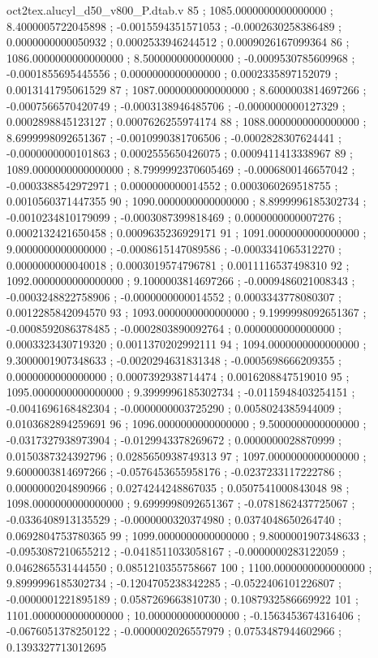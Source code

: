 \begin{filecontents}[overwrite]{oct2tex.alucyl_d50_v800_P.dtab.v}
85 ; 1085.0000000000000000 ; 8.4000005722045898 ; -0.0015594351571053 ; -0.0002630258386489 ; 0.0000000000050932 ; 0.0002533946244512 ; 0.0009026167099364
86 ; 1086.0000000000000000 ; 8.5000000000000000 ; -0.0009530785609968 ; -0.0001855695445556 ; 0.0000000000000000 ; 0.0002335897152079 ; 0.0013141795061529
87 ; 1087.0000000000000000 ; 8.6000003814697266 ; -0.0007566570420749 ; -0.0003138946485706 ; -0.0000000000127329 ; 0.0002898845123127 ; 0.0007626255974174
88 ; 1088.0000000000000000 ; 8.6999998092651367 ; -0.0010990381706506 ; -0.0002828307624441 ; -0.0000000000101863 ; 0.0002555650426075 ; 0.0009411413338967
89 ; 1089.0000000000000000 ; 8.7999992370605469 ; -0.0006800146657042 ; -0.0003388542972971 ; 0.0000000000014552 ; 0.0003060269518755 ; 0.0010560371447355
90 ; 1090.0000000000000000 ; 8.8999996185302734 ; -0.0010234810179099 ; -0.0003087399818469 ; 0.0000000000007276 ; 0.0002132421650458 ; 0.0009635236929171
91 ; 1091.0000000000000000 ; 9.0000000000000000 ; -0.0008615147089586 ; -0.0003341065312270 ; 0.0000000000040018 ; 0.0003019574796781 ; 0.0011116537498310
92 ; 1092.0000000000000000 ; 9.1000003814697266 ; -0.0009486021008343 ; -0.0003248822758906 ; -0.0000000000014552 ; 0.0003343778080307 ; 0.0012285842094570
93 ; 1093.0000000000000000 ; 9.1999998092651367 ; -0.0008592086378485 ; -0.0002803890092764 ; 0.0000000000000000 ; 0.0003323430719320 ; 0.0011370202992111
94 ; 1094.0000000000000000 ; 9.3000001907348633 ; -0.0020294631831348 ; -0.0005698666209355 ; 0.0000000000000000 ; 0.0007392938714474 ; 0.0016208847519010
95 ; 1095.0000000000000000 ; 9.3999996185302734 ; -0.0115948403254151 ; -0.0041696168482304 ; -0.0000000003725290 ; 0.0058024385944009 ; 0.0103682894259691
96 ; 1096.0000000000000000 ; 9.5000000000000000 ; -0.0317327938973904 ; -0.0129943378269672 ; 0.0000000028870999 ; 0.0150387324392796 ; 0.0285650938749313
97 ; 1097.0000000000000000 ; 9.6000003814697266 ; -0.0576453655958176 ; -0.0237233117222786 ; 0.0000000204890966 ; 0.0274244248867035 ; 0.0507541000843048
98 ; 1098.0000000000000000 ; 9.6999998092651367 ; -0.0781862437725067 ; -0.0336408913135529 ; -0.0000000320374980 ; 0.0374048650264740 ; 0.0692804753780365
99 ; 1099.0000000000000000 ; 9.8000001907348633 ; -0.0953087210655212 ; -0.0418511033058167 ; -0.0000000283122059 ; 0.0462865531444550 ; 0.0851210355758667
100 ; 1100.0000000000000000 ; 9.8999996185302734 ; -0.1204705238342285 ; -0.0522406101226807 ; -0.0000001221895189 ; 0.0587269663810730 ; 0.1087932586669922
101 ; 1101.0000000000000000 ; 10.0000000000000000 ; -0.1563453674316406 ; -0.0676051378250122 ; -0.0000002026557979 ; 0.0753487944602966 ; 0.1393327713012695

\end{filecontents}

